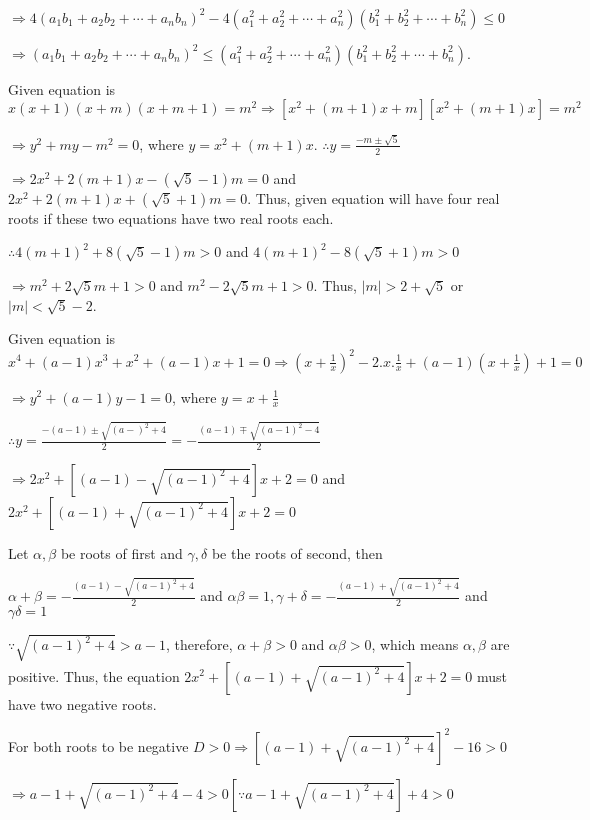   $\Rightarrow 4(a_1b_1 + a_2b_2 + \cdots + a_nb_n)^2 - 4(a_1^2 + a_2^2 + \cdots + a_n^2)(b_1^2 + b_2^2 +
  \cdots + b_n^2) \leq 0$

  $\Rightarrow (a_1b_1 + a_2b_2 + \cdots + a_nb_n)^2\leq (a_1^2 + a_2^2 + \cdots + a_n^2)(b_1^2 + b_2^2 +
  \cdots + b_n^2)$.
\item Given equation is $x(x + 1)(x + m)(x + m + 1) = m^2 \Rightarrow [x^2 + (m + 1)x + m][x^2 + (m + 1)x] =
  m^2$

  $\Rightarrow y^2 + my - m^2 = 0$, where $y = x^2 + (m + 1)x$. $\therefore y = \frac{-m\pm\sqrt{5}}{2}$

  $\Rightarrow 2x^2 + 2(m + 1)x - (\sqrt{5} - 1)m = 0$ and $2x^2 + 2(m + 1)x + (\sqrt{5} + 1)m = 0$. Thus,
  given equation will have four real roots if these two equations have two real roots each.

  $\therefore 4(m + 1)^2 + 8(\sqrt{5} - 1)m > 0$ and $4(m + 1)^2 - 8(\sqrt{5} + 1)m > 0$

  $\Rightarrow m^2 + 2\sqrt{5}m + 1 > 0$ and $m^2 - 2\sqrt{5}m + 1 > 0$. Thus, $|m|> 2 + \sqrt{5}$ or $|m| <
  \sqrt{5} - 2$.
\item Given equation is $x^4 + (a - 1)x^3 + x^2 + (a - 1)x + 1 = 0 \Rightarrow \left(x +
  \frac{1}{x}\right)^2 - 2.x.\frac{1}{x} + (a - 1)\left(x + \frac{1}{x}\right) + 1 = 0$

  $\Rightarrow y^2 + (a - 1)y - 1 = 0$, where $y = x + \frac{1}{x}$

  $\therefore y = \frac{-(a - 1)\pm\sqrt{(a - )^2 + 4}}{2} = -\frac{(a - 1)\mp\sqrt{(a - 1)^2 - 4}}{2}$

  $\Rightarrow 2x^2 + [(a - 1) - \sqrt{(a - 1)^2 + 4}]x + 2 = 0$ and $2x^2 + [(a - 1) + \sqrt{(a - 1)^2 +
      4}]x + 2 = 0$

  Let $\alpha, \beta$ be roots of first and $\gamma, \delta$ be the roots of second, then

  $\alpha + \beta = -\frac{(a - 1) - \sqrt{(a - 1)^2 + 4}}{2}$ and $\alpha\beta = 1, \gamma + \delta =
  -\frac{(a - 1) + \sqrt{(a - 1)^2 + 4}}{2}$ and $\gamma\delta = 1$

  $\because \sqrt{(a - 1)^2 + 4} > a - 1$, therefore, $\alpha + \beta > 0$ and $\alpha\beta > 0$, which
  means $\alpha, \beta$ are positive. Thus, the equation $2x^2 + [(a - 1) + \sqrt{(a - 1)^2 + 4}]x + 2 = 0$
  must have two negative roots.

  For both roots to be negative $D > 0 \Rightarrow [(a - 1) + \sqrt{(a - 1)^2 + 4}]^2 - 16 > 0$

  $\Rightarrow a - 1 + \sqrt{(a - 1)^2 + 4} - 4 > 0 [\because a - 1 + \sqrt{(a - 1)^2 + 4}] + 4 > 0$


